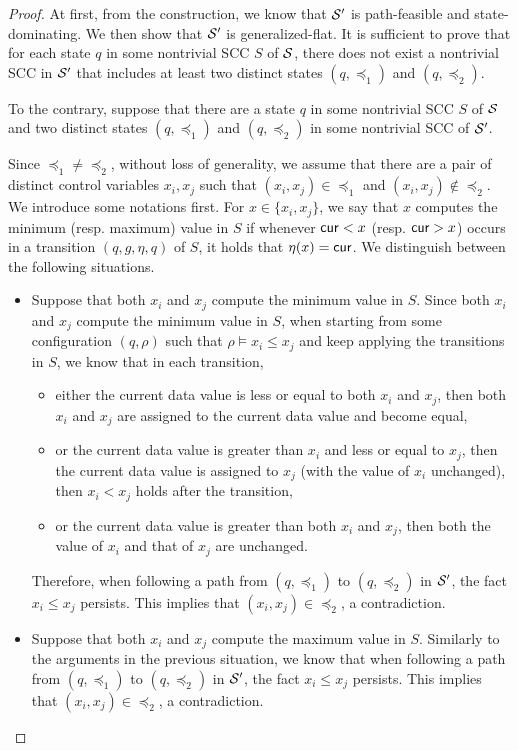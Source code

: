 \begin{appendix}
\begin{proof}
At first, from the construction, we know that ${\mathcal{S} }'$ is path-feasible and state-dominating. We then show that ${\mathcal{S} }'$ is generalized-flat. It is sufficient to prove that for each state $q$ in some nontrivial SCC $S$ of ${\mathcal{S} }$, there does not exist a nontrivial SCC in ${\mathcal{S} }'$ that includes at least two distinct states $(q, \preceq_1)$ and $(q, \preceq_2)$.

To the contrary, suppose that there are a state $q$ in some nontrivial SCC $S$ of ${\mathcal{S} }$ and two distinct states $(q, \preceq_1)$ and $(q, \preceq_2)$ in some nontrivial SCC of ${\mathcal{S} }'$.

Since $\preceq_1 \neq \preceq_2$, without loss of generality, we assume that there are a pair of distinct control variables $x_i, x_j$ such that $(x_i, x_j) \in \preceq_1$ and $(x_i, x_j) \not \in \preceq_2$. 
We introduce some notations first. For $x \in \{x_i, x_j\}$, we say that $x$ computes the minimum (resp. maximum) value in $S$ if whenever $\mathsf{cur} < x$ (resp. $\mathsf{cur} > x$) occurs in a transition $(q, g, \eta, q)$ of $S$, it holds that $\eta(x)=\mathsf{cur}$. 
We distinguish between the following situations.
\begin{itemize}
\item Suppose that both $x_i$ and $x_j$ compute the minimum value in $S$. Since both $x_i$ and $x_j$ compute the minimum value in $S$, when starting from some configuration $(q, \rho)$ such that $\rho \models x_i \le x_j$ and keep applying the transitions in $S$, we know that in each transition, 
\begin{itemize}
\item either the current data value is less or equal to both $x_i$ and $x_j$, then both $x_i$ and $x_j$ are assigned to the current data value and become equal, 
%
\item or the current data value is greater than $x_i$ and less or equal to $x_j$, then the current data value is assigned to $x_j$ (with the value of $x_i$ unchanged), then $x_i < x_j$ holds after the transition,
%
\item or the current data value is greater than both $x_i$ and $x_j$, then both the value of $x_i$ and that of $x_j$ are unchanged.
\end{itemize}
Therefore, when following a path from $(q, \preceq_1)$ to $(q, \preceq_2)$ in ${\mathcal{S} }'$, the fact $x_i \le x_j$ persists. This implies that $(x_i, x_j) \in \preceq_2$, a contradiction.
%
\item Suppose that both $x_i$ and $x_j$ compute the maximum value in $S$. Similarly to the arguments in the previous situation, we know that when following a path from $(q, \preceq_1)$ to $(q, \preceq_2)$ in ${\mathcal{S} }'$, the fact $x_i \le x_j$ persists. This implies that $(x_i, x_j) \in \preceq_2$, a contradiction.

\end{itemize}
\end{proof}
\end{appendix}

